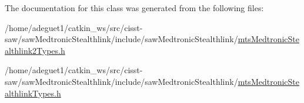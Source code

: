 The documentation for this class was generated from the following files\-:\begin{DoxyCompactItemize}
\item 
/home/adeguet1/catkin\-\_\-ws/src/cisst-\/saw/saw\-Medtronic\-Stealthlink/include/saw\-Medtronic\-Stealthlink/\hyperlink{mts_medtronic_stealthlink2_types_8h}{mts\-Medtronic\-Stealthlink2\-Types.\-h}\item 
/home/adeguet1/catkin\-\_\-ws/src/cisst-\/saw/saw\-Medtronic\-Stealthlink/include/saw\-Medtronic\-Stealthlink/\hyperlink{mts_medtronic_stealthlink_types_8h}{mts\-Medtronic\-Stealthlink\-Types.\-h}\end{DoxyCompactItemize}
